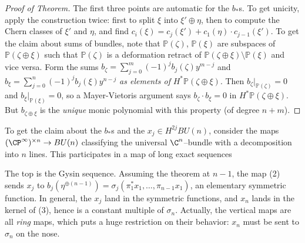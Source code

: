 \begin{subappendices}
\begin{proof}[Proof of Theorem]
The first three points are automatic for the $b_*$s.  To get unicity, apply the construction twice: first to split $\xi$ into $\xi' \oplus \eta$, then to compute the Chern classes of $\xi'$ and $\eta$, and find $c_i(\xi) = c_j(\xi') + c_1(\eta) \cdot c_{j-1}(\xi')$.  To get the claim about sums of bundles, note that $\mathbb P(\zeta)$, $\mathbb P(\xi)$ are subspaces of $\mathbb P(\zeta \oplus \xi)$ such that $\mathbb P(\zeta)$ is a deformation retract of $\mathbb P(\zeta \oplus \xi) \setminus \mathbb P(\xi)$ and vice versa.  Form the sums $b_\zeta = \sum_{j=0}^m (-1)^j b_j(\zeta) y^{m-j}$ and $b_\xi = \sum_{j=0}^n (-1)^j b_j(\xi) y^{n-j}$ \emph{as elements of} $H^* \mathbb P(\zeta \oplus \xi)$.  Then $b_\zeta|_{\mathbb P(\zeta)} = 0$ and $b_\xi|_{\mathbb P(\xi)} = 0$, so a Mayer-Vietoris argument says $b_\zeta \cdot b_\xi = 0$ in $H^* \mathbb P(\zeta \oplus \xi)$.  But $b_{\zeta \oplus \xi}$ is the \emph{unique} monic polynomial with this property (of degree $n + m$).
\end{proof}

To get the claim about the $b_*$s and the $x_j \in H^{2j} BU(n)$, consider the maps $(\CP^\infty)^{\times n} \to BU(n)$ classifying the universal $\C^n$--bundle with a decomposition into $n$ lines.  This participates in a map of long exact sequences
\begin{center}
\end{center}
The top is the Gysin sequence.  Assuming the theorem at $n - 1$, the map (2) sends $x_j$ to $b_j(\eta^{\oplus(n-1)}) = \sigma_j(\pi_1^* x_1, \ldots, \pi_{n-1} x_1)$, an elementary symmetric function.  In general, the $x_j$ land in the symmetric functions, and $x_n$ lands in the kernel of (3), hence is a constant multiple of $\sigma_n$.  Actually, the vertical maps are all \emph{ring} maps, which puts a huge restriction on their behavior: $x_n$ must be sent to $\sigma_n$ on the nose.

\end{subappendices}

